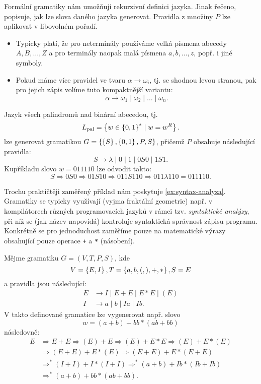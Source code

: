 Formální gramatiky nám umožňují rekurzivní definici jazyka. Jinak řečeno, popisuje, jak lze slova daného jazyka generovat. Pravidla z množiny $P$ lze aplikovat v libovolném pořadí.
\begin{remark}
    \begin{itemize}
        \item Typicky platí, že pro neterminály používáme velká písmena abecedy $A,B,\ldots,Z$ a pro terminály naopak malá písmena $a,b,\ldots,z$, popř. i jiné symboly.
        \item Pokud máme více pravidel ve tvaru $\alpha\to\omega_i$, tj. se shodnou levou stranou, pak pro jejich zápis volíme tuto kompaktnější variantu:
        \[\alpha\to\omega_1\mid\omega_2\mid\dots\mid\omega_n.\]
    \end{itemize}
\end{remark}
\begin{example}
    Jazyk všech palindromů nad binární abecedou, tj.
    \[L_\text{pal}=\left\{w\in\left\{0,1\right\}^*\mid w=w^R\right\}.\]
    lze generovat gramatikou $G=\left\{\left\{S\right\},\left\{0,1\right\},P,S\right\}$, přičemž $P$ obsahuje následující pravidla:
    \[S\to\lambda\mid 0\mid 1\mid 0S0\mid 1S1.\]
    Kupříkladu slovo $w=011110$ lze odvodit takto:
    \[S\Rightarrow 0S0\Rightarrow 01S10\Rightarrow011S110\Rightarrow011\lambda 110=011110.\]
\end{example}
Trochu praktičtěji zaměřený příklad nám poskytuje \ref{ex:syntax-analyza}. Gramatiky se typicky využívají (vyjma fraktální geometrie) např. v kompilátorech různých programovacích jazyků v rámci tzv. \emph{syntaktické analýzy}, při níž se (jak název napovídá) kontroluje syntaktická správnost zápisu programu. Konkrétně se pro jednoduchost zaměříme pouze na matematické výrazy obsahující pouze operace \texttt{+} a \texttt{*} (násobení).
\begin{example}\label{ex:syntax-analyza}
    Mějme gramatiku $G=(V,T,P,S)$, kde
    \[V=\left\{E,I\right\},T=\left\{a,b,(,),+,*\right\},S=E\]
    a pravidla jsou následující:
    \begin{align*}
        E&\to I\mid E+E\mid E*E\mid (E)\\
        I&\to a\mid b\mid Ia\mid Ib.
    \end{align*}
    V takto definované gramatice lze vygenerovat např. slovo
    \[w=(a+b)+bb*(ab+bb)\]
    následovně:
    \begin{align*}
        E&\Rightarrow E+E\Rightarrow(E)+E\Rightarrow(E)+E*E\Rightarrow(E)+E*(E)\\
        &\Rightarrow(E+E)+E*(E)\Rightarrow(E+E)+E*(E+E)\\
        &\Rightarrow^*(I+I)+I*(I+I)\Rightarrow^*(a+b)+Ib*(Ib+Ib)\\
        &\Rightarrow^*(a+b)+bb*(ab+bb).
    \end{align*}
\end{example}
